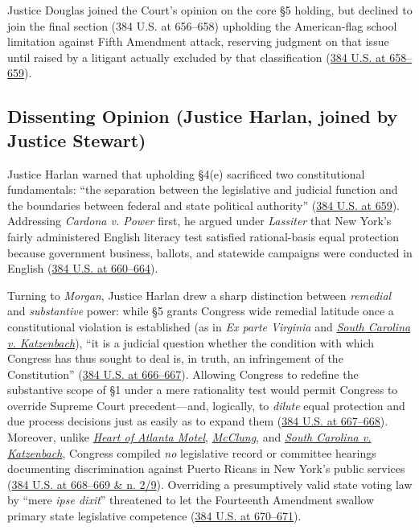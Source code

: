 \documentclass[12pt]{article}
\begin{document}
Justice Douglas joined the Court's opinion on the core \S 5 holding, but declined to join the final section (384 U.S. at 656--658) upholding the American-flag school limitation against Fifth Amendment attack, reserving judgment on that issue until raised by a litigant actually excluded by that classification (\href{https://supreme.justia.com/cases/federal/us/384/641/}{384 U.S. at 658--659}).

\subsection{Dissenting Opinion (Justice Harlan, joined by Justice Stewart)}

Justice Harlan warned that upholding \S 4(e) sacrificed two constitutional fundamentals: ``the separation between the legislative and judicial function and the boundaries between federal and state political authority'' (\href{https://supreme.justia.com/cases/federal/us/384/641/}{384 U.S. at 659}). Addressing \textit{Cardona v. Power} first, he argued under \textit{Lassiter} that New York's fairly administered English literacy test satisfied rational-basis equal protection because government business, ballots, and statewide campaigns were conducted in English (\href{https://supreme.justia.com/cases/federal/us/384/641/}{384 U.S. at 660--664}).

Turning to \textit{Morgan}, Justice Harlan drew a sharp distinction between \textit{remedial} and \textit{substantive} power: while \S 5 grants Congress wide remedial latitude once a constitutional violation is established (as in \textit{Ex parte Virginia} and \href{https://supreme.justia.com/cases/federal/us/383/301/}{\textit{South Carolina v. Katzenbach}}), ``it is a judicial question whether the condition with which Congress has thus sought to deal is, in truth, an infringement of the Constitution'' (\href{https://supreme.justia.com/cases/federal/us/384/641/}{384 U.S. at 666--667}). Allowing Congress to redefine the substantive scope of \S 1 under a mere rationality test would permit Congress to override Supreme Court precedent---and, logically, to \textit{dilute} equal protection and due process decisions just as easily as to expand them (\href{https://supreme.justia.com/cases/federal/us/384/641/}{384 U.S. at 667--668}). Moreover, unlike \href{https://supreme.justia.com/cases/federal/us/379/241/}{\textit{Heart of Atlanta Motel}}, \href{https://supreme.justia.com/cases/federal/us/379/294/}{\textit{McClung}}, and \href{https://supreme.justia.com/cases/federal/us/383/301/}{\textit{South Carolina v. Katzenbach}}, Congress compiled \textit{no} legislative record or committee hearings documenting discrimination against Puerto Ricans in New York's public services (\href{https://supreme.justia.com/cases/federal/us/384/641/}{384 U.S. at 668--669 \& n. 2/9}). Overriding a presumptively valid state voting law by ``mere \textit{ipse dixit}'' threatened to let the Fourteenth Amendment swallow primary state legislative competence (\href{https://supreme.justia.com/cases/federal/us/384/641/}{384 U.S. at 670--671}).
\end{document}

